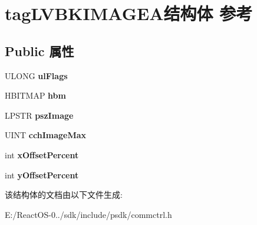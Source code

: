 \hypertarget{structtag_l_v_b_k_i_m_a_g_e_a}{}\section{tag\+L\+V\+B\+K\+I\+M\+A\+G\+E\+A结构体 参考}
\label{structtag_l_v_b_k_i_m_a_g_e_a}
\subsection*{Public 属性}
\begin{DoxyCompactItemize}
\item 
\mbox{\label{structtag_l_v_b_k_i_m_a_g_e_a_aaa96f7f210aef220279b5969ed301882}} 
U\+L\+O\+NG {\bfseries ul\+Flags}
\item 
\mbox{\label{structtag_l_v_b_k_i_m_a_g_e_a_ad08066deb5ad30b5d39cf199e0769987}} 
H\+B\+I\+T\+M\+AP {\bfseries hbm}
\item 
\mbox{\label{structtag_l_v_b_k_i_m_a_g_e_a_a674d2ad840c18b3521a18576d2ddcd47}} 
L\+P\+S\+TR {\bfseries psz\+Image}
\item 
\mbox{\label{structtag_l_v_b_k_i_m_a_g_e_a_acac38a61220c0b6be63cb5956a313301}} 
U\+I\+NT {\bfseries cch\+Image\+Max}
\item 
\mbox{\label{structtag_l_v_b_k_i_m_a_g_e_a_aa4573a1cce01267896a2e1a4c06af4c5}} 
int {\bfseries x\+Offset\+Percent}
\item 
\mbox{\label{structtag_l_v_b_k_i_m_a_g_e_a_aa4e09cc206fa1c9be14260d27bc85bfb}} 
int {\bfseries y\+Offset\+Percent}
\end{DoxyCompactItemize}


该结构体的文档由以下文件生成\+:\begin{DoxyCompactItemize}
\item 
E\+:/\+React\+O\+S-\/0../sdk/include/psdk/commctrl.\+h\end{DoxyCompactItemize}
